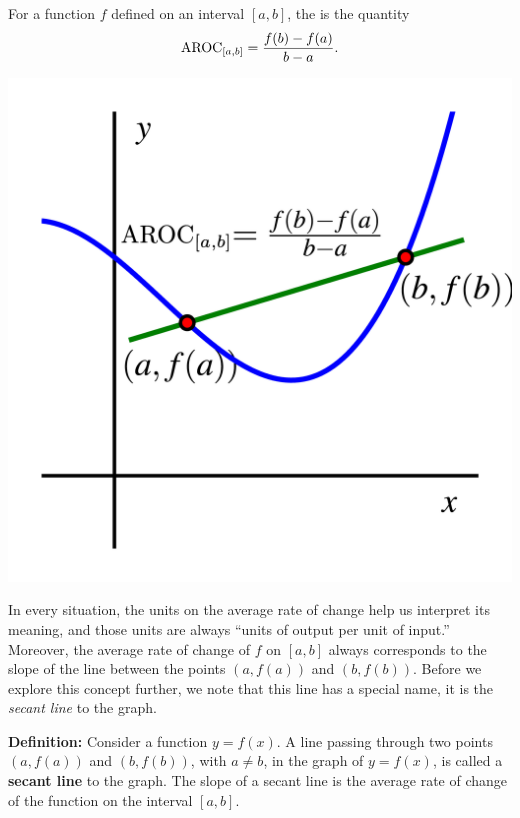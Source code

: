 \documentclass[nooutcomes]{ximera}
\begin{document}
\begin{definition}
For a function $f$ defined on an interval $[a,b]$, the  is the quantity%
\begin{equation*}
\mathrm{AROC}_{[a,b]} = \frac{f(b) - f(a)}{b-a}\text{.}
\end{equation*}

\begin{image}
\includegraphics[width=.7\textwidth]{aroc-f-x-defn.jpg}
\end{image}

\end{definition}
In every situation, the units on the average rate of change help us interpret its meaning, and those units are always ``units of output per unit of input.''   Moreover, the average rate of change of $f$ on $[a,b]$ always corresponds to the slope of the line between the points $(a,f(a))$ and $(b,f(b))$. Before we explore this concept further, we note that this line has a special name, it is the \textit{secant line} to the graph. 

\begin{callout}
  {\bf Definition:} Consider a function $y=f(x)$. A line passing through two points $(a,f(a))$ and $(b,f(b))$, with $a \neq b$, in the graph of $y=f(x)$, is called a \textbf{secant line} to the graph. The slope of a secant line is the average rate of change of the function on the interval $[a,b]$.
\end{callout}
\end{document}
